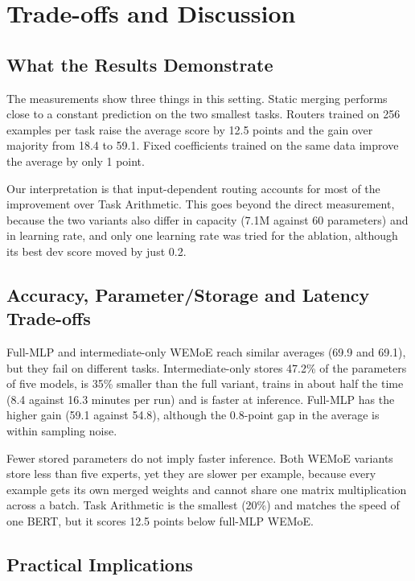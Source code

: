 \chapter{Trade-offs and Discussion}
\label{ch:discussion}

\section{What the Results Demonstrate}

The measurements show three things in this setting. Static merging performs close to a constant prediction on the two smallest tasks. Routers trained on 256 examples per task raise the average score by 12.5 points and the gain over majority from 18.4 to 59.1. Fixed coefficients trained on the same data improve the average by only 1 point.

Our interpretation is that input-dependent routing accounts for most of the improvement over Task Arithmetic. This goes beyond the direct measurement, because the two variants also differ in capacity (7.1M against 60 parameters) and in learning rate, and only one learning rate was tried for the ablation, although its best dev score moved by just 0.2.

\section{Accuracy, Parameter/Storage and Latency Trade-offs}

Full-MLP and intermediate-only WEMoE reach similar averages (69.9 and 69.1), but they fail on different tasks. Intermediate-only stores 47.2\% of the parameters of five models, is 35\% smaller than the full variant, trains in about half the time (8.4 against 16.3 minutes per run) and is faster at inference. Full-MLP has the higher gain (59.1 against 54.8), although the 0.8-point gap in the average is within sampling noise.

Fewer stored parameters do not imply faster inference. Both WEMoE variants store less than five experts, yet they are slower per example, because every example gets its own merged weights and cannot share one matrix multiplication across a batch. Task Arithmetic is the smallest (20\%) and matches the speed of one BERT, but it scores 12.5 points below full-MLP WEMoE.

\section{Practical Implications}

